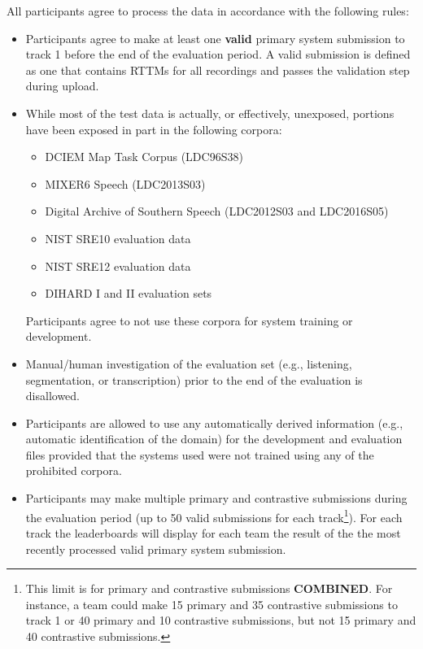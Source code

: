 \documentclass{article}
\begin{document}
All participants agree to process the data in accordance with the following rules:
%
\begin{itemize}
    \item Participants agree to make at least one {\bf valid} primary system submission to track 1 before the end of the evaluation period. A valid submission is defined as one that contains RTTMs for all recordings and passes the validation step during upload.
    \item While most of the test data is actually, or effectively, unexposed, portions have been exposed in part in the following corpora:
    	\begin{itemize}
            \item DCIEM Map Task Corpus (LDC96S38)
            \item MIXER6 Speech (LDC2013S03)
            \item Digital Archive of Southern Speech (LDC2012S03 and LDC2016S05)
			\item NIST SRE10 evaluation data
            \item NIST SRE12 evaluation data
            \item DIHARD I and II evaluation sets
        \end{itemize}
        Participants agree to not use these corpora for system training or development.
    \item Manual/human investigation of the evaluation set (e.g., listening, segmentation, or transcription) prior to the end of the evaluation is disallowed.
    \item Participants are allowed to use any automatically derived information  (e.g., automatic identification of the domain) for the development and evaluation files provided that the systems used were not trained using any of the prohibited corpora.
    \item Participants may make multiple primary and contrastive submissions during the evaluation period (up to 50 valid submissions for each track\footnote{This limit is for primary and contrastive submissions {\bf COMBINED}. For instance, a team could make 15 primary and 35 contrastive submissions to track 1 or 40 primary and 10 contrastive submissions, but not 15 primary and 40 contrastive submissions.}).  For each track the leaderboards will display for each team the result of the the most recently processed valid primary system submission. 
\end{itemize}
\end{document}

